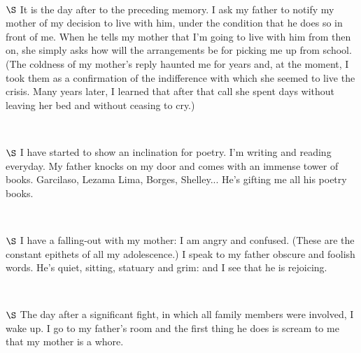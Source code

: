 \documentclass[a4paper, 12pt]{article}
\begin{document}
~ 

$\S$ It is the day after to the preceding memory. I ask my father to notify my
mother of my decision to live with him, under the condition that he does so in
front of me. When he tells my mother that I'm going to live with him from then
on, she simply asks how will the arrangements be for picking me up from school.
(The coldness of my mother's reply haunted me for years and, at the moment, I
took them as a confirmation of the indifference with which she seemed to live
the crisis. Many years later, I learned that after that call she spent days
without leaving her bed and without ceasing to cry.)

~ 

$\S$ I have started to show an inclination for poetry. I'm writing and reading
everyday. My father knocks on my door and comes with an immense tower of books.
Garcilaso, Lezama Lima, Borges, Shelley... He's gifting me all his poetry
books.

~ 

$\S$ I have a falling-out with my mother: I am angry and confused. (These are
the constant epithets of all my adolescence.) I speak to my father obscure and
foolish words. He's quiet, sitting, statuary and grim: and I see that he is
rejoicing.

~ 

$\S$ The day after a significant fight, in which all family members were
involved, I wake up. I go to my father's room and the first thing he does is
scream to me that my mother is a whore.
\end{document}
